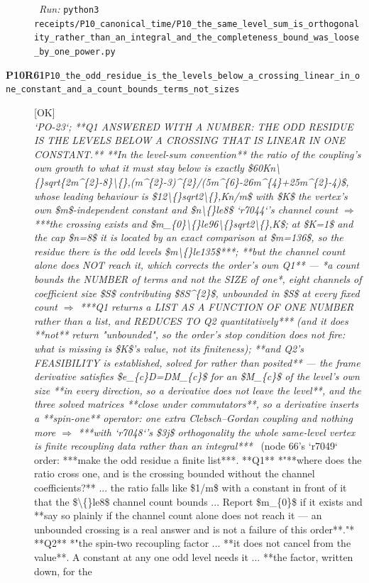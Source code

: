 \begin{description}
\ \emph{Run:} \texttt{python3 receipts/P10\_canonical\_time/P10\_the\_same\_level\_sum\_is\_orthogonality\_rather\_than\_an\_integral\_and\_the\_completeness\_bound\_was\_loose\_by\_one\_power.py}
\item[\rcptlabel{P10_the_odd_residue_is_the_levels_below_a_crossing_linear_in_one_constant_and_a_count_bounds_terms_not_sizes}{P10R61}\textbf{P10R61}\quad\texttt{P10\_the\_odd\_residue\_is\_the\_levels\_below\_a\_crossing\_linear\_in\_one\_constant\_and\_a\_count\_bounds\_terms\_not\_sizes}]\hfill\textsf{[OK]}\\
\textit{`PO-23`;  **Q1 ANSWERED WITH A NUMBER: THE ODD RESIDUE IS THE LEVELS BELOW A CROSSING THAT IS LINEAR IN ONE CONSTANT.** **In the level-sum convention** the ratio of the coupling's own growth to what it must stay below is exactly \$60Kn\textbackslash\{\}sqrt\{2m\textasciicircum{}\{2\}-8\}\textbackslash\{\},(m\textasciicircum{}\{2\}-3)\textasciicircum{}\{2\}/(5m\textasciicircum{}\{6\}-26m\textasciicircum{}\{4\}+25m\textasciicircum{}\{2\}-4)\$, whose leading behaviour is \$12\textbackslash\{\}sqrt2\textbackslash\{\},Kn/m\$ with \$K\$ the vertex's own \$m\$-independent constant and \$n\textbackslash\{\}le8\$ `r7044`'s channel count \ensuremath{\Rightarrow} ***the crossing exists and \$m\_\{0\}\textbackslash\{\}le96\textbackslash\{\}sqrt2\textbackslash\{\},K\$; at \$K=1\$ and the cap \$n=8\$ it is located by an exact comparison at \$m=136\$, so the residue there is the odd levels \$m\textbackslash\{\}le135\$***;  **but the channel count alone does NOT reach it, which corrects the order's own Q1** --- *a count bounds the NUMBER of terms and not the SIZE of one*, eight channels of coefficient size \$S\$ contributing \$8S\textasciicircum{}\{2\}\$, unbounded in \$S\$ at every fixed count \ensuremath{\Rightarrow} ***Q1 returns a LIST AS A FUNCTION OF ONE NUMBER rather than a list, and REDUCES TO Q2 quantitatively*** (and it does **not** return "unbounded", so the order's stop condition does not fire: what is missing is \$K\$'s value, not its finiteness);  **and Q2's FEASIBILITY is established, solved for rather than posited** --- the frame derivative satisfies \$e\_\{c\}D=DM\_\{c\}\$ for an \$M\_\{c\}\$ of the level's own size **in every direction, so a derivative does not leave the level**, and the three solved matrices **close under commutators**, so a derivative inserts a **spin-one** operator: one extra Clebsch--Gordan coupling and nothing more \ensuremath{\Rightarrow} ***with `r7048`'s \$3j\$ orthogonality the whole same-level vertex is finite recoupling data rather than an integral***} \ (node 66's `r7049` order: ***make the odd residue a finite list***. **Q1** *"**where does the ratio cross one, and is the crossing bounded without the channel coefficients?** ... the ratio falls like \$1/m\$ with a constant in front of it that the \$\textbackslash\{\}le8\$ channel count bounds ... Report \$m\_\{0\}\$ if it exists and **say so plainly if the channel count alone does not reach it --- an unbounded crossing is a real answer and is not a failure of this order**."* **Q2** *"the spin-two recoupling factor ... **it does not cancel from the value**. A constant at any one odd level needs it ... **the factor, written down, for the 
\end{description}
